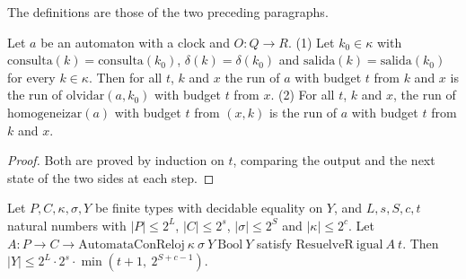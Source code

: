 \begin{definition}
  \label{def:dynamics-clock}
  \leanok
  The definitions are those of the two preceding paragraphs.
  \own{}
\end{definition}

\begin{theorem}
  \label{thm:dynamics-clock-state}
  \leanok
  Let $a$ be an automaton with a clock and $O : Q \to R$. (1) Let $k_0 \in \kappa$ with
  $\mathrm{consulta}(k) = \mathrm{consulta}(k_0)$, $\delta(k) = \delta(k_0)$ and
  $\mathrm{salida}(k) = \mathrm{salida}(k_0)$ for every $k \in \kappa$. Then for all $t$, $k$ and $x$
  the run of $a$ with budget $t$ from $k$ and $x$ is the run of $\mathrm{olvidar}(a, k_0)$ with
  budget $t$ from $x$. (2) For all $t$, $k$ and $x$, the run of $\mathrm{homogeneizar}(a)$ with
  budget $t$ from $(x, k)$ is the run of $a$ with budget $t$ from $k$ and $x$.
  \own{}
\end{theorem}

\begin{proof}
  \leanok
  Both are proved by induction on $t$, comparing the output and the next state of the two sides at
  each step.
\end{proof}

\begin{theorem}
  \label{thm:dynamics-cube-clock}
  \leanok
  Let $P, C, \kappa, \sigma, Y$ be finite types with decidable equality on $Y$, and
  $L, s, S, c, t$ natural numbers with $|P| \le 2^L$, $|C| \le 2^s$, $|\sigma| \le 2^S$ and
  $|\kappa| \le 2^c$. Let $A : P \to C \to \mathrm{AutomataConReloj}\ \kappa\ \sigma\ Y\ \mathrm{Bool}\ Y$
  satisfy $\mathrm{ResuelveR}\ \mathrm{igual}\ A\ t$. Then
  $|Y| \le 2^L \cdot 2^s \cdot \min(t+1,\ 2^{S+c-1})$.
  \own{}
\end{theorem}

